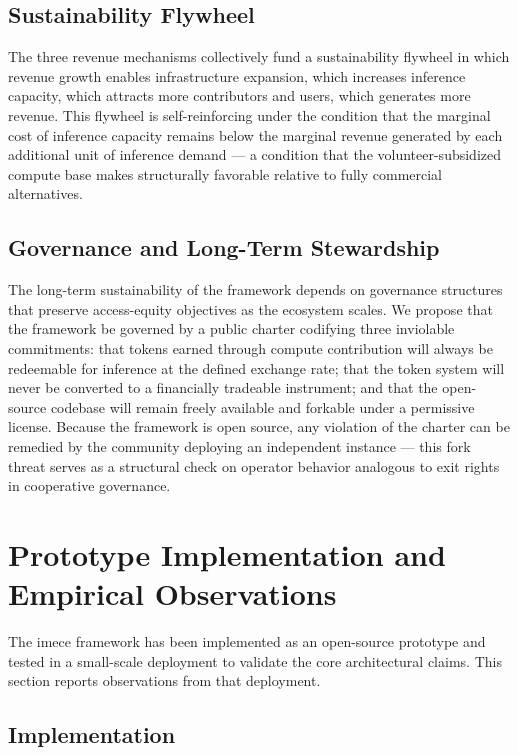 \documentclass[12pt]{article}
\begin{document}
\subsection{Sustainability Flywheel}

The three revenue mechanisms collectively fund a sustainability flywheel in which revenue growth enables infrastructure expansion, which increases inference capacity, which attracts more contributors and users, which generates more revenue. This flywheel is self-reinforcing under the condition that the marginal cost of inference capacity remains below the marginal revenue generated by each additional unit of inference demand — a condition that the volunteer-subsidized compute base makes structurally favorable relative to fully commercial alternatives.

\subsection{Governance and Long-Term Stewardship}

The long-term sustainability of the framework depends on governance structures that preserve access-equity objectives as the ecosystem scales. We propose that the framework be governed by a public charter codifying three inviolable commitments: that tokens earned through compute contribution will always be redeemable for inference at the defined exchange rate; that the token system will never be converted to a financially tradeable instrument; and that the open-source codebase will remain freely available and forkable under a permissive license. Because the framework is open source, any violation of the charter can be remedied by the community deploying an independent instance — this fork threat serves as a structural check on operator behavior analogous to exit rights in cooperative governance.

\section{Prototype Implementation and Empirical Observations}
\label{sec:empirical}

The imece framework has been implemented as an open-source prototype and tested in a small-scale deployment to validate the core architectural claims. This section reports observations from that deployment.

\subsection{Implementation}
\end{document}
